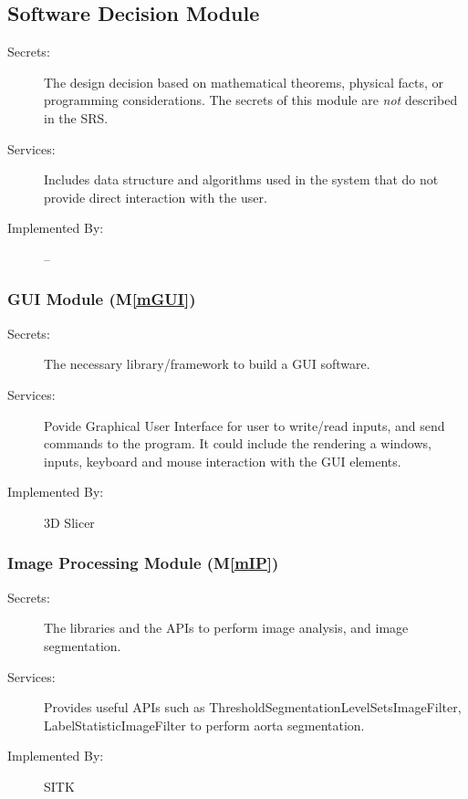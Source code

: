 \documentclass[12pt, titlepage]{article}
\newcommand{\mref}[1]{M\ref{#1}}
\begin{document}
\subsection{Software Decision Module}

\begin{description}
\item[Secrets:] The design decision based on mathematical theorems, physical
  facts, or programming considerations. The secrets of this module are
  \emph{not} described in the SRS.
\item[Services:] Includes data structure and algorithms used in the system that
  do not provide direct interaction with the user. 
\item[Implemented By:] --
\end{description}


\subsubsection{GUI Module (\mref{mGUI})}
\begin{description}
\item[Secrets:]The necessary library/framework to build a GUI software.
\item[Services:]Povide Graphical User Interface for user to write/read inputs, and send commands to the program. It could include the rendering a windows, inputs, keyboard and mouse interaction with the GUI elements.
\item[Implemented By:] 3D Slicer
\end{description}

\subsubsection{Image Processing Module (\mref{mIP})}
\begin{description}
\item[Secrets:] The libraries and the APIs to perform image analysis, and image segmentation.
\item[Services:] Provides useful APIs such as ThresholdSegmentationLevelSetsImageFilter, LabelStatisticImageFilter to perform aorta segmentation.
\item[Implemented By:] SITK
\end{description}
\end{document}
